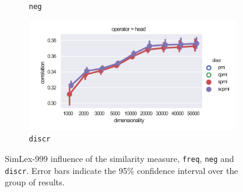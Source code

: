 \begin{figure}
\begin{subfigure}[t]{0.49\textwidth}
  \caption{\texttt{neg}}
  \label{fig:SimLex999-neg}
  \end{subfigure}
  \begin{subfigure}[t]{0.49\textwidth}
  \includegraphics[width=\textwidth]{supplement/figures/SimLex999-interaction-discr}

  \caption{\texttt{discr}}
  \label{fig:SimLex999-discr}
  \end{subfigure}
  
  \caption[SimLex-999 influence of the similarity measure, \texttt{freq}, \texttt{neg} and \texttt{discr}]{SimLex-999 influence of the similarity measure, \texttt{freq}, \texttt{neg} and \texttt{discr}. Error bars indicate the 95\% confidence interval over the group of results.}
\end{figure}
